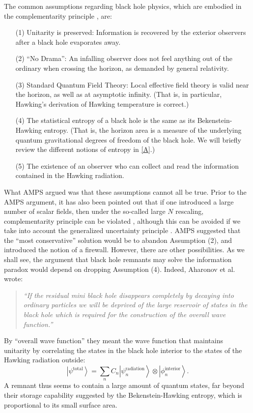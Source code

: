 \documentclass[12pt]{article}
\newcommand{\2}{$^2$}
\newcommand{\3}{$^3$}
\newcommand{\4}{$_4$}
\newcommand{\5}{$_5$}
\begin{document}
The common assumptions regarding black hole physics, which are embodied in the complementarity principle \cite{kn:stu}, are:
\begin{itemize}
\item[(1)] Unitarity is preserved: Information is recovered by the exterior observers after a black hole evaporates away.
\item[(2)] ``No Drama'': An infalling observer does not feel anything out of the ordinary when crossing the horizon, as demanded by general relativity.
\item[(3)] Standard Quantum Field Theory: Local effective field theory is valid near the horizon, as well as at asymptotic infinity. (That is, in particular, Hawking's derivation of Hawking temperature is correct.)
\item[(4)] The statistical entropy of a black hole is the same as its Bekenstein-Hawking entropy. (That is, the horizon area is a measure of the underlying quantum gravitational degrees of freedom of the black hole. We will briefly review the different notions of entropy in \ref{A}.) 
\item[(5)] The existence of an observer who can collect and read the information contained in the Hawking radiation.
 \end{itemize}
What AMPS argued was that these assumptions cannot all be true. Prior to the AMPS argument, it has also been pointed out that if one introduced a large number of scalar fields, then under the so-called large $N$ rescaling, complementarity principle can be violated \cite{Yeom:2008qw1,Yeom:2008qw0}, although this can be avoided if we take into account the generalized uncertainty principle \cite{COY}. AMPS suggested that the ``most conservative'' solution would be to abandon Assumption (2), and introduced the notion of a firewall. However, there are other possibilities. As we shall see, the argument that black hole remnants may solve the information paradox would depend on dropping Assumption (4). Indeed, Aharonov et al. \cite{ACN} wrote:
\begin{quote}
\emph{``If the residual mini black hole disappears completely by decaying into ordinary particles we will be deprived of the large reservoir of states in the black hole which is required for the construction of the overall wave function.''}
\end{quote}
By ``overall wave function'' they meant the wave function that maintains unitarity by correlating the states in the black hole interior to the states of the Hawking radiation outside:
\begin{equation}
\left|\psi^{\text{total}} \right\rangle = \sum_n C_n \left|\psi_n^{\text{radiation}} \right\rangle  \otimes \left|\phi_n^{\text{interior}}\right\rangle.
\end{equation}
A remnant thus seems to contain a large amount of quantum states, far beyond their storage capability suggested by the Bekenstein-Hawking entropy, which is proportional to its small surface area.
\end{document}
